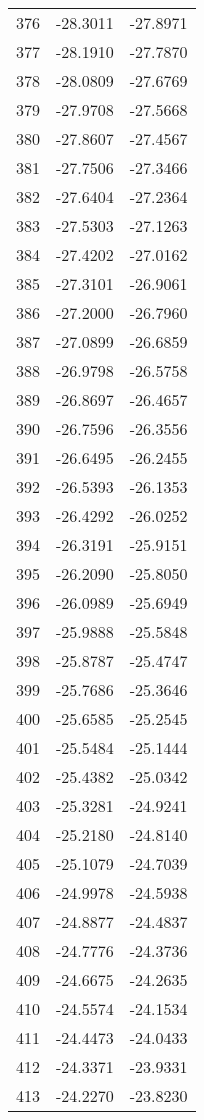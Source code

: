 \documentclass{article}
\begin{document}
\begin{longtable}{|c|c|c|}
376 & -28.3011 & -27.8971 \\
377 & -28.1910 & -27.7870 \\
378 & -28.0809 & -27.6769 \\
379 & -27.9708 & -27.5668 \\
380 & -27.8607 & -27.4567 \\
381 & -27.7506 & -27.3466 \\
382 & -27.6404 & -27.2364 \\
383 & -27.5303 & -27.1263 \\
384 & -27.4202 & -27.0162 \\
385 & -27.3101 & -26.9061 \\
386 & -27.2000 & -26.7960 \\
387 & -27.0899 & -26.6859 \\
388 & -26.9798 & -26.5758 \\
389 & -26.8697 & -26.4657 \\
390 & -26.7596 & -26.3556 \\
391 & -26.6495 & -26.2455 \\
392 & -26.5393 & -26.1353 \\
393 & -26.4292 & -26.0252 \\
394 & -26.3191 & -25.9151 \\
395 & -26.2090 & -25.8050 \\
396 & -26.0989 & -25.6949 \\
397 & -25.9888 & -25.5848 \\
398 & -25.8787 & -25.4747 \\
399 & -25.7686 & -25.3646 \\
400 & -25.6585 & -25.2545 \\
401 & -25.5484 & -25.1444 \\
402 & -25.4382 & -25.0342 \\
403 & -25.3281 & -24.9241 \\
404 & -25.2180 & -24.8140 \\
405 & -25.1079 & -24.7039 \\
406 & -24.9978 & -24.5938 \\
407 & -24.8877 & -24.4837 \\
408 & -24.7776 & -24.3736 \\
409 & -24.6675 & -24.2635 \\
410 & -24.5574 & -24.1534 \\
411 & -24.4473 & -24.0433 \\
412 & -24.3371 & -23.9331 \\
413 & -24.2270 & -23.8230 \\

\end{longtable}
\end{document}
